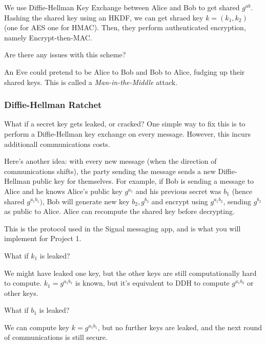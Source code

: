 We use Diffie-Hellman Key Exchange between Alice and Bob to get shared $g^{ab}$. Hashing the shared key using an HKDF, we can get shraed key $k = (k_1, k_2)$ (one for AES one for HMAC). Then, they perform authenticated encryption, namely Encrypt-then-MAC.

\begin{ques*}
    Are there any issues with this scheme?
\end{ques*}
An Eve could pretend to be Alice to Bob and Bob to Alice, fudging up their shared keys. This is called a \emph{Man-in-the-Middle} attack.

\subsubsection{Diffie-Hellman Ratchet}
What if a secret key gets leaked, or cracked? One simple way to fix this is to perform a Diffie-Hellman key exchange on every message. However, this incurs additionall communications costs.

Here's another idea: with every new message (when the direction of communications shifts), the party sending the message sends a new Diffie-Hellman public key for themselves. For example, if Bob is sending a message to Alice and he knows Alice's public key $g^{a_1}$ and his previous secret was $b_1$ (hence shared $g^{a_1b_1})$, Bob will generate new key $b_2, g^{b_2}$ and encrypt using $g^{a_1b_2}$, sending $g^{b_2}$ as public to Alice. Alice can recompute the shared key before decrypting.


This is the protocol used in the Signal messaging app, and is what you will implement for Project 1.

\begin{ques*}
    What if $k_1$ is leaked?
\end{ques*}
We might have leaked one key, but the other keys are still computationally hard to compute. $k_1=g^{a_1b_1}$ is known, but it's equivalent to DDH to compute $g^{a_1b_2}$ or other keys.

\begin{ques*}
    What if $b_1$ is leaked?
\end{ques*}
We can compute key $k=g^{a_1b_1}$, but no further keys are leaked, and the next round of communications is still secure.

